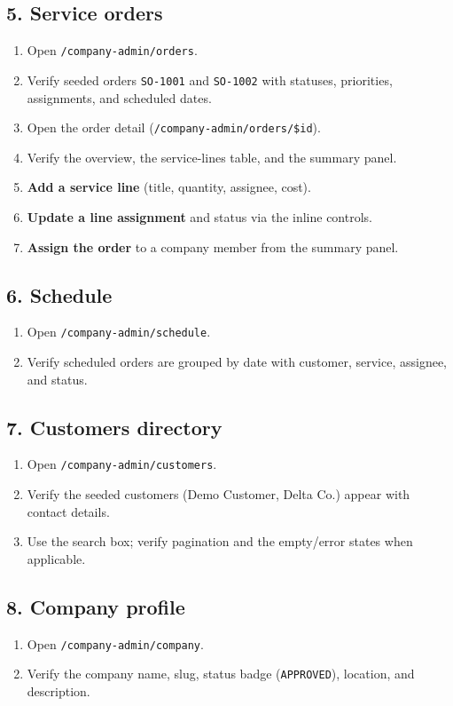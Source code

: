 \documentclass[11pt,a4paper]{article}
\begin{document}
\subsection{5. Service orders}
\begin{enumerate}[leftmargin=2em, itemsep=2pt]
  \item Open \texttt{/company-admin/orders}.
  \item Verify seeded orders \texttt{SO-1001} and \texttt{SO-1002} with statuses, priorities, assignments, and scheduled dates.
  \item Open the order detail (\texttt{/company-admin/orders/\$id}).
  \item Verify the overview, the service-lines table, and the summary panel.
  \item \textbf{Add a service line} (title, quantity, assignee, cost).
  \item \textbf{Update a line assignment} and status via the inline controls.
  \item \textbf{Assign the order} to a company member from the summary panel.
\end{enumerate}

\subsection{6. Schedule}
\begin{enumerate}[leftmargin=2em, itemsep=2pt]
  \item Open \texttt{/company-admin/schedule}.
  \item Verify scheduled orders are grouped by date with customer, service, assignee, and status.
\end{enumerate}

\subsection{7. Customers directory}
\begin{enumerate}[leftmargin=2em, itemsep=2pt]
  \item Open \texttt{/company-admin/customers}.
  \item Verify the seeded customers (Demo Customer, Delta Co.) appear with contact details.
  \item Use the search box; verify pagination and the empty/error states when applicable.
\end{enumerate}

\subsection{8. Company profile}
\begin{enumerate}[leftmargin=2em, itemsep=2pt]
  \item Open \texttt{/company-admin/company}.
  \item Verify the company name, slug, status badge (\texttt{APPROVED}), location, and description.
\end{enumerate}
\end{document}
